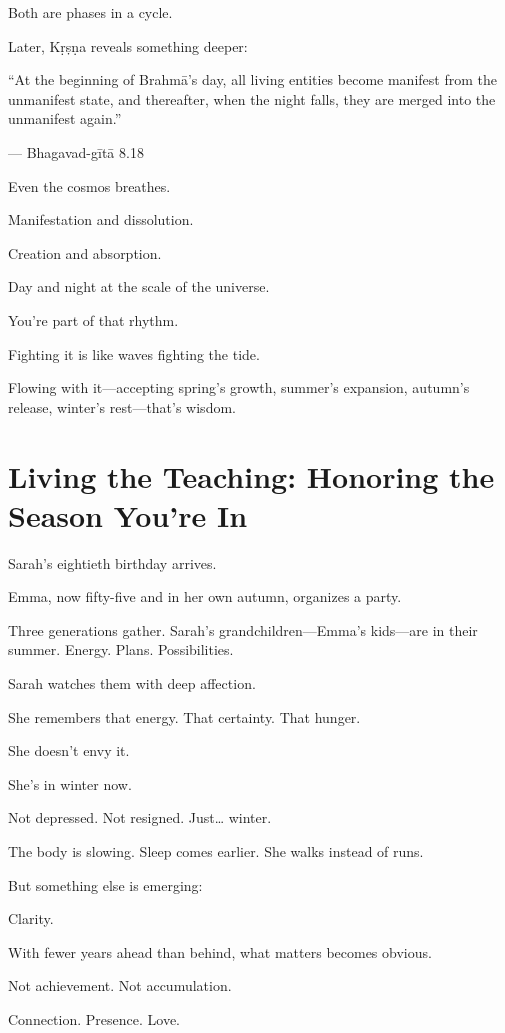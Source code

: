 \documentclass[11pt,twoside]{book}
\begin{document}
Both are phases in a cycle.

Later, Kṛṣṇa reveals something deeper:

\begin{pullquote}
``At the beginning of Brahmā's day, all living entities become manifest from the unmanifest state, and thereafter, when the night falls, they are merged into the unmanifest again.''

--- Bhagavad-gītā 8.18
\end{pullquote}

Even the cosmos breathes.

Manifestation and dissolution.

Creation and absorption.

Day and night at the scale of the universe.

You're part of that rhythm.

Fighting it is like waves fighting the tide.

Flowing with it—accepting spring's growth, summer's expansion, autumn's release, winter's rest—that's wisdom.

\section*{Living the Teaching: Honoring the Season You're In}

Sarah's eightieth birthday arrives.

Emma, now fifty-five and in her own autumn, organizes a party.

Three generations gather. Sarah's grandchildren—Emma's kids—are in their summer. Energy. Plans. Possibilities.

Sarah watches them with deep affection.

She remembers that energy. That certainty. That hunger.

She doesn't envy it.

She's in winter now.

Not depressed. Not resigned. Just\ldots{} winter.

The body is slowing. Sleep comes earlier. She walks instead of runs.

But something else is emerging:

Clarity.

With fewer years ahead than behind, what matters becomes obvious.

Not achievement. Not accumulation.

Connection. Presence. Love.
\end{document}
